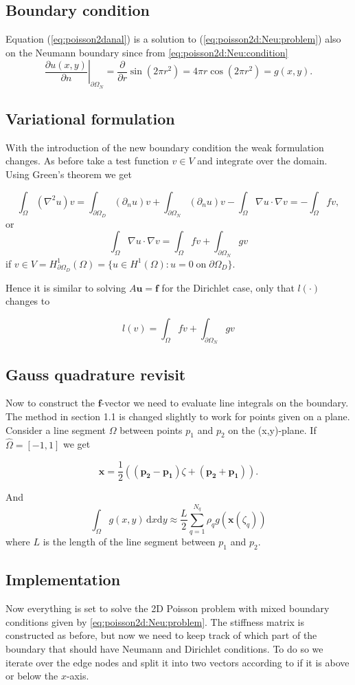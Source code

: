 \documentclass[paper=a4, fontsize=11pt]{scrartcl} %
\begin{document}
\subsection{Boundary condition}
Equation (\ref{eq:poisson2danal}) is a solution to (\ref{eq:poisson2d:Neu:problem}) also on the Neumann boundary since from \eqref{eq:poisson2d:Neu:condition}
\[\left. \frac{\partial u(x,y)}{\partial n}\right|_{\partial\Omega_N} = \frac{\partial}{\partial r} \sin(2\pi r^2) = 4\pi r\cos(2\pi r^2) = g(x,y).\]
\subsection{Variational formulation}
With the introduction of the new boundary condition the weak formulation changes. As before take a test function $v\in V$ and integrate over the domain. Using Green's theorem we get

\[\int_{\Omega}  (\nabla^2u)v = \int_{\partial\Omega_D} (\partial_n u) v + \int_{\partial\Omega_N} (\partial_n u) v-\int_{\Omega} \nabla u \cdot \nabla v = -\int_{\Omega} f v,\]
or 
\[\int_{\Omega} \nabla u \cdot \nabla v = \int_{\Omega} f v +  \int_{\partial\Omega_N} \! g v\]
if $v\in V= H^1_{\partial\Omega_D}(\Omega) = \{u\in H^1(\Omega) : u=0 \; \mathrm{on} \;  \partial\Omega_D\}$.

Hence it is similar to solving $A\mathbf{u}=\mathbf{f}$ for the Dirichlet case, only that $l(\cdot)$ changes to

\begin{equation}
l(v)=\int_{\Omega} f v  +  \int_{\partial\Omega_N} \! g v
\label{eq:poisson2d:l}
\end{equation}
\subsection{Gauss quadrature revisit}
Now to construct the $\mathbf{f}$-vector we need to evaluate line integrals on the boundary. The method in section 1.1 is changed slightly to work for points given on a plane. Consider a line segment $\Omega$ between points $p_1$ and $p_2$ on the (x,y)-plane. If $\hat{\Omega}=[-1,1]$ we get

\[ \mathbf{x}=\frac{1}{2} \left((\mathbf{p_2}-\mathbf{p_1}) \zeta +(\mathbf{p_2}+\mathbf{p_1})\right).\]

And 
\[ \int_{\Omega} \! g(x,y) \, \mathrm{d}x\mathrm{d}y \approx \frac{L}{2}\sum_{q=1}^{N_q} \rho_{q}g(\mathbf{x}(\zeta_q))
\]
where $L$ is the length of the line segment between $p_1$ and $p_2$.
\subsection{Implementation}
Now everything is set to solve the 2D Poisson problem with mixed boundary conditions given by \eqref{eq:poisson2d:Neu:problem}.
The stiffness matrix is constructed as before, but now we need to keep track of which part of the boundary that should have Neumann and Dirichlet conditions. To do so we iterate over the edge nodes and split it into two vectors according to if it is above or below the $x$-axis.
\end{document}
